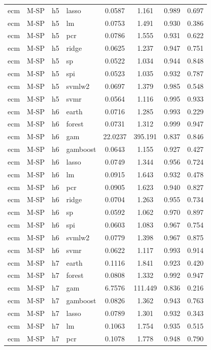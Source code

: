 \begin{ThreePartTable}
\begin{longtable}[t]{llclcccc}
ecm & M-SP & h5 & lasso & 0.0587 & 1.161 & 0.989 & 0.697\\
ecm & M-SP & h5 & lm & 0.0753 & 1.491 & 0.930 & 0.386\\
ecm & M-SP & h5 & pcr & 0.0786 & 1.555 & 0.931 & 0.622\\
ecm & M-SP & h5 & ridge & 0.0625 & 1.237 & 0.947 & 0.751\\
ecm & M-SP & h5 & sp & 0.0522 & 1.034 & 0.944 & 0.848\\
ecm & M-SP & h5 & spi & 0.0523 & 1.035 & 0.932 & 0.787\\
ecm & M-SP & h5 & svmlw2 & 0.0697 & 1.379 & 0.985 & 0.548\\
ecm & M-SP & h5 & svmr & 0.0564 & 1.116 & 0.995 & 0.933\\
\addlinespace
ecm & M-SP & h6 & earth & 0.0716 & 1.285 & 0.993 & 0.229\\
ecm & M-SP & h6 & forest & 0.0731 & 1.312 & 0.999 & 0.947\\
ecm & M-SP & h6 & gam & 22.0237 & 395.191 & 0.837 & 0.846\\
ecm & M-SP & h6 & gamboost & 0.0643 & 1.155 & 0.927 & 0.427\\
ecm & M-SP & h6 & lasso & 0.0749 & 1.344 & 0.956 & 0.724\\
ecm & M-SP & h6 & lm & 0.0915 & 1.643 & 0.932 & 0.478\\
ecm & M-SP & h6 & pcr & 0.0905 & 1.623 & 0.940 & 0.827\\
ecm & M-SP & h6 & ridge & 0.0704 & 1.263 & 0.955 & 0.734\\
ecm & M-SP & h6 & sp & 0.0592 & 1.062 & 0.970 & 0.897\\
ecm & M-SP & h6 & spi & 0.0603 & 1.083 & 0.967 & 0.754\\
ecm & M-SP & h6 & svmlw2 & 0.0779 & 1.398 & 0.967 & 0.875\\
ecm & M-SP & h6 & svmr & 0.0622 & 1.117 & 0.993 & 0.914\\
\addlinespace
ecm & M-SP & h7 & earth & 0.1116 & 1.841 & 0.923 & 0.420\\
ecm & M-SP & h7 & forest & 0.0808 & 1.332 & 0.992 & 0.947\\
ecm & M-SP & h7 & gam & 6.7576 & 111.449 & 0.836 & 0.216\\
ecm & M-SP & h7 & gamboost & 0.0826 & 1.362 & 0.943 & 0.763\\
ecm & M-SP & h7 & lasso & 0.0789 & 1.301 & 0.932 & 0.343\\
ecm & M-SP & h7 & lm & 0.1063 & 1.754 & 0.935 & 0.515\\
ecm & M-SP & h7 & pcr & 0.1078 & 1.778 & 0.948 & 0.790\\

\end{longtable}
\end{ThreePartTable}
